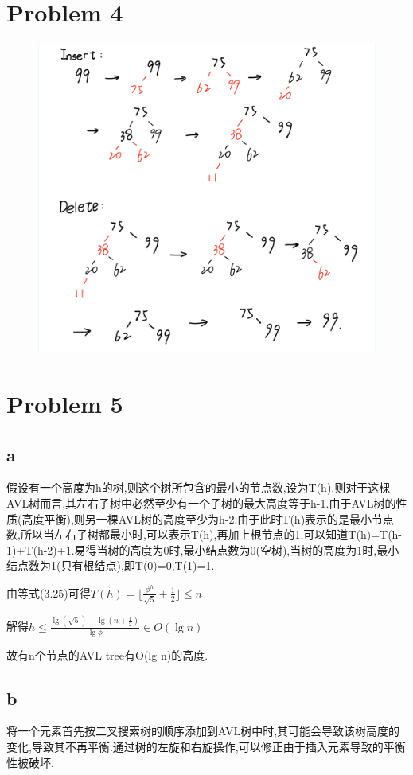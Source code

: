 \documentclass[12pt,a4paper,fontset=none]{ctexart}
\begin{document}
\section*{Problem 4}
\begin{figure}[H]
	\centering
	\includegraphics[width=0.7\linewidth]{4题图.png}
\end{figure}
\section*{Problem 5}
\subsection*{a}
假设有一个高度为h的树,则这个树所包含的最小的节点数,设为T(h).则对于这棵AVL树而言,其左右子树中必然至少有一个子树的最大高度等于h-1.由于AVL树的性质(高度平衡),则另一棵AVL树的高度至少为h-2.由于此时T(h)表示的是最小节点数,所以当左右子树都最小时,可以表示T(h),再加上根节点的1,可以知道T(h)=T(h-1)+T(h-2)+1.易得当树的高度为0时,最小结点数为0(空树),当树的高度为1时,最小结点数为1(只有根结点),即T(0)=0,T(1)=1.

由等式(3.25)可得$T(h)=\bigg\lfloor \frac{\phi ^h}{\sqrt{5}}+\frac{1}{2}\bigg\rfloor \leq n$

解得$h\leq \frac{\lg (\sqrt{5})+\lg (n+\frac{1}{2} )}{\lg \phi}\in O(\lg n) $

故有n个节点的AVL tree有O(lg n)的高度.
\subsection*{b}
将一个元素首先按二叉搜索树的顺序添加到AVL树中时,其可能会导致该树高度的变化,导致其不再平衡.通过树的左旋和右旋操作,可以修正由于插入元素导致的平衡性被破坏.
\end{document}
